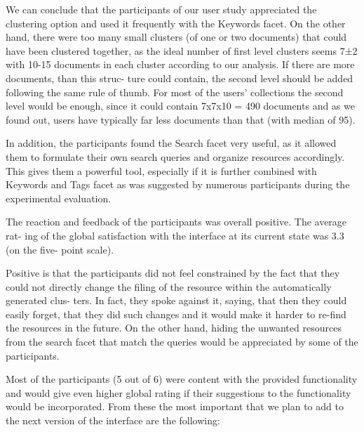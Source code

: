 \documentclass{llncs}
\begin{document}
We can conclude that the participants of our user study appreciated the clustering option and used it frequently with the Keywords facet. On the other hand, there were too many small clusters (of one or two documents) that could have been clustered together, as the ideal number of first level clusters seems 7±2 with 10-15 documents in each cluster according to our analysis. If there are more documents, than this struc- ture could contain, the second level should be added following the same rule of thumb. For most of the users’ collections the second level would be enough, since it could contain 7x7x10 = 490 documents and as we found out, users have typically far less documents than that (with median of 95).

In addition, the participants found the Search facet very useful, as it allowed them to formulate their own search queries and organize resources accordingly. This gives them a powerful tool, especially if it is further combined with Keywords and Tags facet as was suggested by numerous participants during the experimental evaluation.

The reaction and feedback of the participants was overall positive. The average rat- ing of the global satisfaction with the interface at its current state was 3.3 (on the five- point scale).

Positive is that the participants did not feel constrained by the fact that they could not directly change the filing of the resource within the automatically generated clus- ters. In fact, they spoke against it, saying, that then they could easily forget, that they did such changes and it would make it harder to re-find the resources in the future. On the other hand, hiding the unwanted resources from the search facet that match the queries would be appreciated by some of the participants.

Most of the participants (5 out of 6) were content with the provided functionality and would give even higher global rating if their suggestions to the functionality would be incorporated. From these the most important that we plan to add to the next version of the interface are the following:
\end{document}
